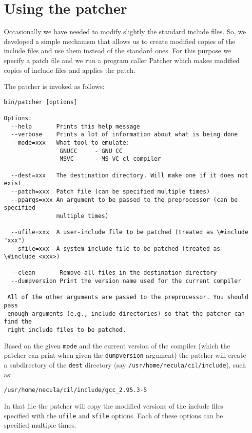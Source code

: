 \documentclass{article}
\def\t#1{{\tt #1}}
\begin{document}
    \section{Using the patcher}\label{sec-patcher}

 Occasionally we have needed to modify slightly the standard include files.
So, we developed a simple mechanism that allows us to create modified copies
of the include files and use them instead of the standard ones. For this
purpose we specify a patch file and we run a program caller Patcher which
makes modified copies of include files and applies the patch.

 The patcher is invoked as follows: 
\begin{verbatim}
bin/patcher [options]

Options:
  --help       Prints this help message
  --verbose    Prints a lot of information about what is being done
  --mode=xxx   What tool to emulate: 
                GNUCC     - GNU CC
                MSVC      - MS VC cl compiler

  --dest=xxx   The destination directory. Will make one if it does not exist
  --patch=xxx  Patch file (can be specified multiple times)
  --ppargs=xxx An argument to be passed to the preprocessor (can be specified
               multiple times)

  --ufile=xxx  A user-include file to be patched (treated as \#include "xxx")
  --sfile=xxx  A system-include file to be patched (treated as \#include <xxx>)
 
  --clean       Remove all files in the destination directory
  --dumpversion Print the version name used for the current compiler

 All of the other arguments are passed to the preprocessor. You should pass
 enough arguments (e.g., include directories) so that the patcher can find the
 right include files to be patched.
\end{verbatim}

 Based on the given \t{mode} and the current version of the compiler (which
the patcher can print when given the \t{dumpversion} argument) the patcher
will create a subdirectory of the \t{dest} directory (say \t{/usr/home/necula/cil/include}), such as:
\begin{verbatim}
/usr/home/necula/cil/include/gcc_2.95.3-5
\end{verbatim}

 In that file the patcher will copy the modified versions of the include files
specified with the \t{ufile} and \t{sfile} options. Each of these options can
be specified multiple times. 
\end{document}
